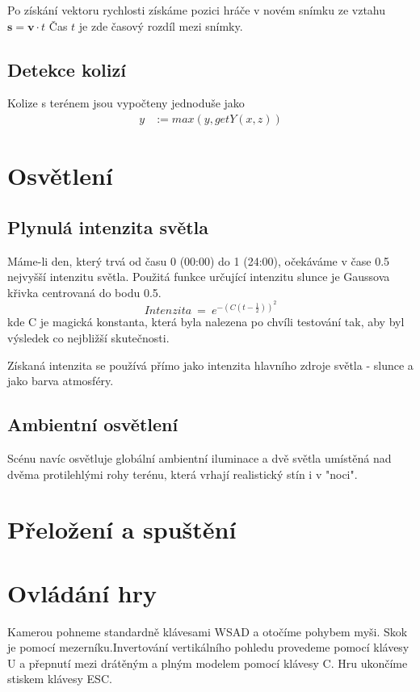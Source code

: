 \documentclass[11pt]{article}
\begin{document}
Po získání vektoru rychlosti získáme pozici hráče v novém snímku ze vztahu
$\mathbf{s} = \mathbf{v} \cdot t$
Čas $t$ je zde časový rozdíl mezi snímky.

\subsection{Detekce kolizí}
Kolize s terénem jsou vypočteny jednoduše jako 
\begin{align*}
y &:= max(y, getY(x, z))
\end{align*}



\section{Osvětlení}
\subsection{Plynulá intenzita světla}
Máme-li den, který trvá od času 0 (00:00) do 1 (24:00), očekáváme v čase 0.5
nejvyšší intenzitu světla. Použitá funkce určující intenzitu slunce je Gaussova
křivka centrovaná do bodu 0.5.
$$
Intenzita~=~e^{- (C(t - \frac{1}{2}))^2}
$$
kde C je magická konstanta, která byla nalezena po chvíli testování tak, aby
byl výsledek co nejbližší skutečnosti.

Získaná intenzita se používá přímo jako intenzita hlavního zdroje světla - slunce a jako barva atmosféry.
\subsection{Ambientní osvětlení}
Scénu navíc osvětluje globální ambientní iluminace a dvě světla umístěná nad
dvěma protilehlými rohy terénu, která vrhají realistický stín i v "noci".

\section{Přeložení a spuštění}
\section{Ovládání hry}
Kamerou pohneme standardně klávesami WSAD a otočíme pohybem myši. Skok je
pomocí mezerníku.Invertování vertikálního pohledu provedeme pomocí klávesy U a
přepnutí mezi drátěným a plným modelem pomocí klávesy C. Hru ukončíme stiskem
klávesy ESC.
\end{document}
